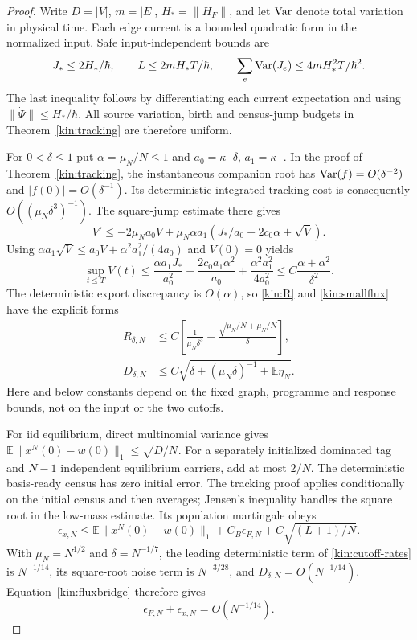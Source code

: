 \documentclass[11pt]{article}
\theoremstyle{definition}\newtheorem{definition}[theorem]{Definition}
\theoremstyle{remark}\newtheorem{remark}[theorem]{Remark}
\newcommand{\E}{\mathbb E}\newcommand{\Prb}{\mathbb P}
\begin{document}
\begin{proof}
Write $D=|V|$, $m=|E|$, $H_* =\|H_F\|$, and let $\operatorname{Var}$ denote total
variation in physical time.  Each edge current is a bounded quadratic form
in the normalized input.  Safe input-independent bounds are
\[
 J_*\le 2H_*/\hbar,\qquad
 L\le 2mH_*T/\hbar,\qquad
 \sum_e\operatorname{Var}(J_e)\le 4mH_*^2T/\hbar^2.
\]
The last inequality follows by differentiating each current expectation
and using $\|\dot\Psi\|\le H_*/\hbar$.  All source variation, birth and
census-jump budgets in Theorem~\ref{kin:tracking} are therefore uniform.

For $0<\delta\le1$ put $\alpha=\mu_N/N\le1$ and
$a_0=\kappa_-\delta$, $a_1=\kappa_+$.  In the proof of
Theorem~\ref{kin:tracking}, the instantaneous companion root has
$\operatorname{Var}(f)=O(\delta^{-2})$ and $|f(0)|=O(\delta^{-1})$.
Its deterministic integrated tracking cost is consequently
$O((\mu_N\delta^3)^{-1})$.  The square-jump estimate there gives
\[
 V'\le-2\mu_Na_0V+
 \mu_N\alpha a_1(J_*/a_0+2c_0\alpha+\sqrt V).
\]
Using
$\alpha a_1\sqrt V\le a_0V+\alpha^2a_1^2/(4a_0)$ and $V(0)=0$
yields
\[
 \sup_{t\le T}V(t)\le
 \frac{\alpha a_1J_*}{a_0^2}
 +\frac{2c_0a_1\alpha^2}{a_0}
 +\frac{\alpha^2a_1^2}{4a_0^2}
 \le C\frac{\alpha+\alpha^2}{\delta^2}.
\]
The deterministic export discrepancy is $O(\alpha)$, so
\eqref{kin:R} and \eqref{kin:smallflux} have the explicit forms
\begin{align}\label{kin:cutoff-rates}
 R_{\delta,N}&\le C\left[
 \frac{1}{\mu_N\delta^3}
 +\frac{\sqrt{\mu_N/N}+\mu_N/N}{\delta}\right],\\
 D_{\delta,N}&\le C\sqrt{\delta+(\mu_N\delta)^{-1}
                    +\E\eta_N}.\nonumber
\end{align}
Here and below constants depend on the fixed graph, programme and response
bounds, not on the input or the two cutoffs.

For iid equilibrium, direct multinomial variance gives
$\E\|x^N(0)-w(0)\|_1\le\sqrt{D/N}$.  For a separately initialized
dominated tag and $N-1$ independent equilibrium carriers, add at most
$2/N$.  The deterministic basis-ready census has zero initial error.
The tracking proof applies conditionally on the initial census and then
averages; Jensen's inequality handles the square root in the low-mass
estimate.  Its population martingale obeys
\[
 \epsilon_{x,N}\le\E\|x^N(0)-w(0)\|_1
   +C_B\epsilon_{F,N}+C\sqrt{(L+1)/N}.
\]
With $\mu_N=N^{1/2}$ and $\delta=N^{-1/7}$, the leading deterministic
term of \eqref{kin:cutoff-rates} is $N^{-1/14}$, its square-root noise
term is $N^{-3/28}$, and $D_{\delta,N}=O(N^{-1/14})$.
Equation~\eqref{kin:fluxbridge} therefore gives
\[
 \epsilon_{F,N}+\epsilon_{x,N}=O(N^{-1/14}).
\]


\end{proof}
\end{document}
